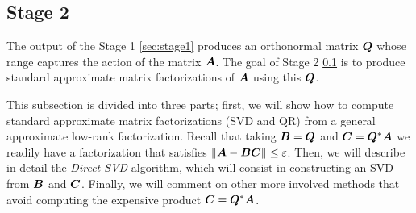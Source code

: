 \begin{figure}[ht]
\begin{center}
\end{center}
\end{figure}



\subsection{Stage 2} \label{sec:stage2}
 The output of the Stage 1 \ref{sec:stage1} produces an orthonormal matrix $\bm{Q}$ whose
 range captures the action of the matrix $\bm{A}$. The goal of Stage 2
 \ref{sec:stage2} is 
 to produce standard approximate matrix factorizations of $\bm{A}$
 using this $\bm{Q}$.

This subsection is divided into three parts; first, we will show how to compute
standard approximate matrix factorizations (SVD and QR) from a general 
approximate low-rank factorization. Recall that taking $\bm{B}=\bm{Q}$
and $\bm{C}=\bm{Q}^*\bm{A}$ we readily have a factorization that
satisfies $\|\bm{A}-\bm{B}\bm{C}\|\leq\varepsilon$.
Then, we will describe in detail the \textit{Direct SVD} algorithm, which will
consist in constructing an SVD from $\bm{B}$ and $\bm{C}$. Finally, we will
comment on other more involved methods that avoid computing the expensive
product $\bm{C}=\bm{Q}^*\bm{A}$.

